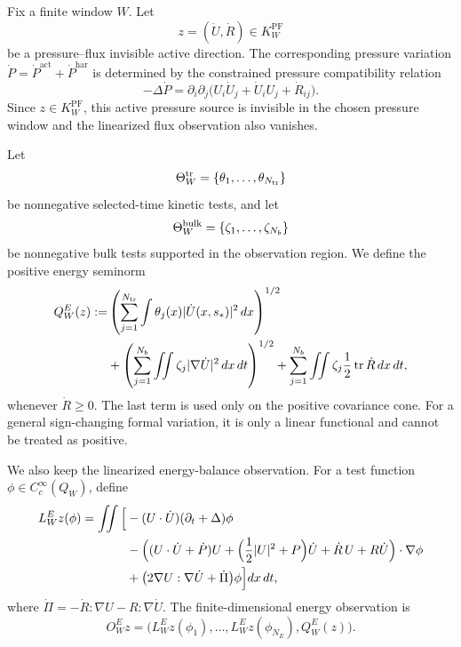 \documentclass[11pt]{article}
\numberwithin{equation}{section}
\theoremstyle{plain}
\theoremstyle{definition}
\theoremstyle{remark}
\newcommand{\PF}{\mathrm{PF}}
\newcommand{\har}{\mathrm{har}}
\newcommand{\tr}{\operatorname{tr}}
\newcommand{\act}{\mathrm{act}}
\begin{document}
Fix a finite window \(W\).  Let
\[
        z=(\dot U,\dot R)\in K^{\PF}_W
\]
be a pressure--flux invisible active direction.  The corresponding pressure variation \(\dot P=\dot P^{\act}+\dot P^{\har}\) is determined by the constrained pressure compatibility relation
\[
        -\Delta\dot P
        =
        \partial_i\partial_j
        \bigl(U_i\dot U_j+\dot U_iU_j+\dot R_{ij}\bigr).
\]
Since \(z\in K^{\PF}_W\), this active pressure source is invisible in the chosen pressure window and the linearized flux observation also vanishes.

Let
\[
        \Theta^{\rm tr}_W=\{\theta_1,\dots,\theta_{N_{\rm tr}}\}
\]
be nonnegative selected-time kinetic tests, and let
\[
        \Theta^{\rm bulk}_W=\{\zeta_1,\dots,\zeta_{N_b}\}
\]
be nonnegative bulk tests supported in the observation region.  We define the positive energy seminorm
\begin{align}
        Q^E_W(z)
        :=&
        \left(
            \sum_{j=1}^{N_{\rm tr}}
            \int \theta_j(x)|\dot U(x,s_*)|^2\,dx
        \right)^{1/2}
        \notag\\
        &+
        \left(
            \sum_{j=1}^{N_b}
            \iint \zeta_j|\nabla\dot U|^2\,dx\,dt
        \right)^{1/2}
        +
        \sum_{j=1}^{N_b}
        \iint \zeta_j\frac12\tr\dot R\,dx\,dt,
        \label{eq:positive-energy-seminorm}
\end{align}
whenever \(\dot R\ge0\).  The last term is used only on the positive covariance cone.  For a general sign-changing formal variation, it is only a linear functional and cannot be treated as positive.

We also keep the linearized energy-balance observation.  For a test function \(\phi\in C_c^\infty(Q_W)\), define
\begin{align}
        L^E_Wz(\phi)
        =
        \iint
        \Big[{}&
        -(U\cdot\dot U)(\partial_t+\Delta)\phi
        \notag\\
        &-
        \Big(
            (U\cdot\dot U+\dot P)U
            +
            \Big(\frac12|U|^2+P\Big)\dot U
            +
            \dot R\,U
            +
            R\dot U
        \Big)\cdot\nabla\phi
        \notag\\
        &+
        \bigl(2\nabla U:\nabla\dot U+\dot\Pi\bigr)\phi
        \Big]dx\,dt,
        \label{eq:linearized-energy-observation}
\end{align}
where \(\dot\Pi=-\dot R:\nabla U-R:\nabla\dot U\).  The finite-dimensional energy observation is
\[
        O^E_Wz
        =
        \bigl(L^E_Wz(\phi_1),\dots,L^E_Wz(\phi_{N_E}),Q^E_W(z)\bigr).
\]
\end{document}
